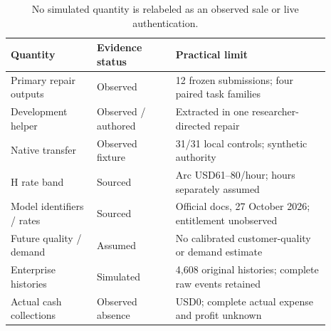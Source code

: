 \begin{table}[H]\centering\small
\begin{tabular}{@{}p{0.24\linewidth}p{0.22\linewidth}p{0.43\linewidth}@{}}\toprule
Quantity & Evidence status & Practical limit \\ \midrule
Primary repair outputs & Observed & 12 frozen submissions; four paired task families \\
Development helper & Observed / authored & Extracted in one researcher-directed repair \\
Native transfer & Observed fixture & 31/31 local controls; synthetic authority \\
H rate band & Sourced & Arc USD61--80/hour; hours separately assumed \\
Model identifiers / rates & Sourced & Official docs, 27 October 2026; entitlement unobserved \\
Future quality / demand & Assumed & No calibrated customer-quality or demand estimate \\
Enterprise histories & Simulated & 4,608 original histories; complete raw events retained \\
Actual cash collections & Observed absence & USD0; complete actual expense and profit unknown \\
\bottomrule\end{tabular}
\caption{No simulated quantity is relabeled as an observed sale or live authentication.}
\end{table}
